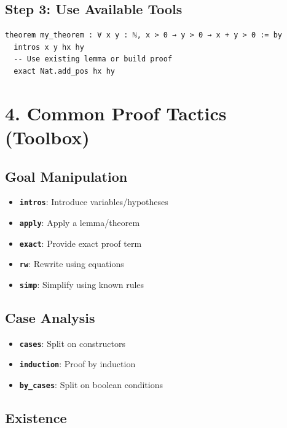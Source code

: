 \documentclass{amsart}
\theoremstyle{plain}
\theoremstyle{definition}
\theoremstyle{remark}
\begin{document}
\subsection{\textbf{Step 3: Use Available Tools}}

\begin{lstlisting}[language=lean]
theorem my_theorem : ∀ x y : ℕ, x > 0 → y > 0 → x + y > 0 := by
  intros x y hx hy
  -- Use existing lemma or build proof
  exact Nat.add_pos hx hy
\end{lstlisting}

\section{\textbf{4. Common Proof Tactics (Toolbox)}}

\subsection{\textbf{Goal Manipulation}}

\begin{itemize}
	\item \textbf{\lstinline{intros}}: Introduce variables/hypotheses
	\item \textbf{\lstinline{apply}}: Apply a lemma/theorem
	\item \textbf{\lstinline{exact}}: Provide exact proof term
	\item \textbf{\lstinline{rw}}: Rewrite using equations
	\item \textbf{\lstinline{simp}}: Simplify using known rules
\end{itemize}

\subsection{\textbf{Case Analysis}}

\begin{itemize}
	\item \textbf{\lstinline{cases}}: Split on constructors
	\item \textbf{\lstinline{induction}}: Proof by induction
	\item \textbf{\lstinline{by_cases}}: Split on boolean conditions
\end{itemize}

\subsection{\textbf{Existence}}
\end{document}

